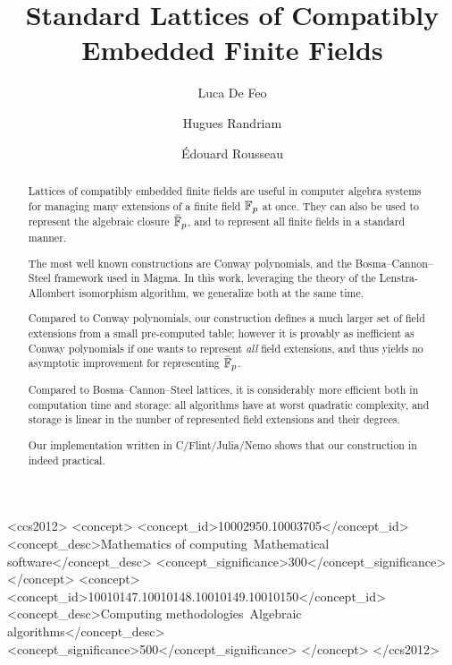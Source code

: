 \documentclass[sigconf]{acmart}
\begin{document}
\title{Standard Lattices of Compatibly Embedded Finite Fields}

\author{Luca De Feo}
\author{Hugues Randriam}
\author{\'Edouard Rousseau}

\begin{abstract}
  Lattices of compatibly embedded finite fields are useful in computer
  algebra systems for managing many extensions of a finite field
  $\mathbb{F}_p$ at once. %
  They can also be used to represent the algebraic closure $\bar{\mathbb{F}}_p$,
  and to represent all finite fields in a standard manner.

  The most well known constructions are Conway polynomials, and the
  Bosma--Cannon--Steel framework used in Magma. %
  In this work, leveraging the theory of the Lenstra-Allom\-bert
  isomorphism algorithm, we generalize both at the same time. %
  
  Compared to Conway polynomials, our construction defines a much
  larger set of field extensions from a small pre-computed table;
  however it is provably as inefficient as Conway polynomials if one
  wants to represent \emph{all} field extensions, and thus yields no
  asymptotic improvement for representing $\bar{\mathbb{F}}_p$.

  Compared to Bosma--Cannon--Steel lattices, it is considerably more
  efficient both in computation time and storage: all algorithms have
  at worst quadratic complexity, and storage is linear in the number
  of represented field extensions and their degrees.

  Our implementation written in C/Flint/Julia/Nemo shows that our
  construction in indeed practical.
\end{abstract}

\begin{CCSXML}
<ccs2012>
<concept>
<concept_id>10002950.10003705</concept_id>
<concept_desc>Mathematics of computing~Mathematical software</concept_desc>
<concept_significance>300</concept_significance>
</concept>
<concept>
<concept_id>10010147.10010148.10010149.10010150</concept_id>
<concept_desc>Computing methodologies~Algebraic algorithms</concept_desc>
<concept_significance>500</concept_significance>
</concept>
</ccs2012>
\end{CCSXML}
\end{document}
